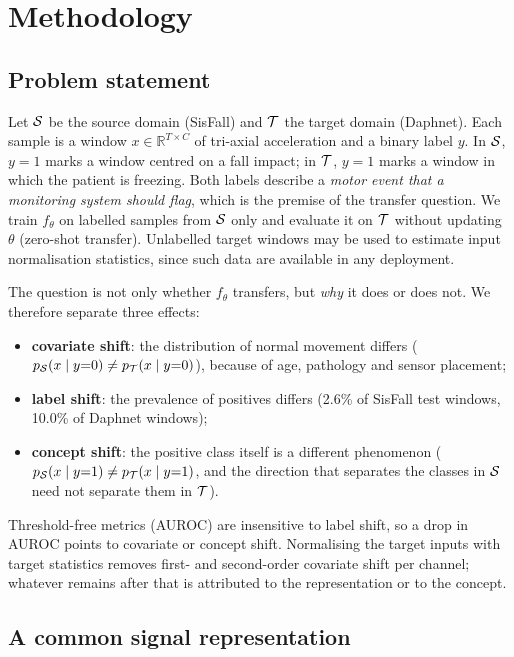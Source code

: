 \chapter{Methodology}
\label{ch:method}

\section{Problem statement}
\label{sec:problem}

Let $\mathcal{S}$ be the source domain (SisFall) and $\mathcal{T}$ the target domain (Daphnet). Each sample is a
window $x\in\mathbb{R}^{T\times C}$ of tri-axial acceleration and a binary label $y$. In $\mathcal{S}$,
$y=1$ marks a window centred on a fall impact; in $\mathcal{T}$, $y=1$ marks a window in which the patient
is freezing. Both labels describe a \emph{motor event that a monitoring system should flag}, which
is the premise of the transfer question. We train $f_\theta$ on labelled samples from $\mathcal{S}$ only and
evaluate it on $\mathcal{T}$ without updating $\theta$ (zero-shot transfer). Unlabelled target windows may
be used to estimate input normalisation statistics, since such data are available in any deployment.

The question is not only whether $f_\theta$ transfers, but \emph{why} it does or does not. We
therefore separate three effects:
\begin{itemize}
  \item \textbf{covariate shift}: the distribution of normal movement differs ($p_{\mathcal{S}}(x\mid y{=}0)\neq p_{\mathcal{T}}(x\mid y{=}0)$), because of age, pathology and sensor placement;
  \item \textbf{label shift}: the prevalence of positives differs (2.6\% of SisFall test windows, 10.0\% of Daphnet windows);
  \item \textbf{concept shift}: the positive class itself is a different phenomenon ($p_{\mathcal{S}}(x\mid y{=}1)\neq p_{\mathcal{T}}(x\mid y{=}1)$, and the direction that separates the classes in $\mathcal{S}$ need not separate them in $\mathcal{T}$).
\end{itemize}
Threshold-free metrics (AUROC) are insensitive to label shift, so a drop in AUROC points to covariate or
concept shift. Normalising the target inputs with target statistics removes first- and
second-order covariate shift per channel; whatever remains after that is attributed to the
representation or to the concept.

\section{A common signal representation}
\label{sec:representation}

